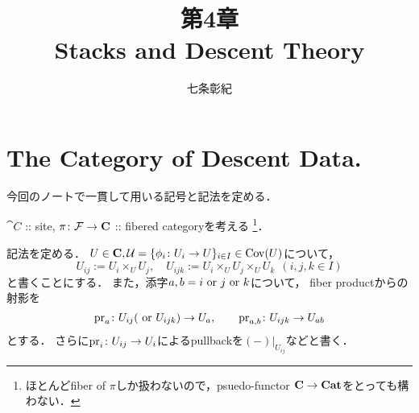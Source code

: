 \documentclass[a4paper, dvipdfmx]{jsarticle}
\begin{document}
\title{第4章 \\ Stacks and Descent Theory}
\author{七条彰紀}
\maketitle

\section{The Category of Descent Data.}
    今回のノートで一貫して用いる記号と記法を定める．

    $\cat{C}$ :: site, 
    $\pi \colon \mathcal{F} \to \mathbf{C}$ :: fibered categoryを考える
    \footnote{ ほとんどfiber of $\pi$しか扱わないので，psuedo-functor $\mathbf{C} \to \mathbf{Cat}$をとっても構わない． }．

    記法を定める．
    $U \in \mathbf{C}, \mathcal{U}=\{\phi_i \colon U_i \to U\}_{i \in I} \in \operatorname{Cov}(U)$について，
    \[ U_{ij}:=U_i \times_U U_j, \quad U_{ijk}:=U_i \times_U U_j \times_U U_k \ \ (i,j,k \in I) \]
    と書くことにする．
    また，添字$a,b=i \text{ or } j \text{ or } k$について，
    fiber productからの射影を
    \[ \operatorname{pr}_{a} \colon U_{ij} (\text{ or } U_{ijk}) \to U_{a}, \qquad \operatorname{pr}_{a,b} \colon U_{ijk} \to U_{ab} \]
    とする．
    さらに$\operatorname{pr}_{i} \colon U_{ij} \to U_{i}$によるpullbackを$(-)|_{U_{ij}}$などと書く．
\end{document}
